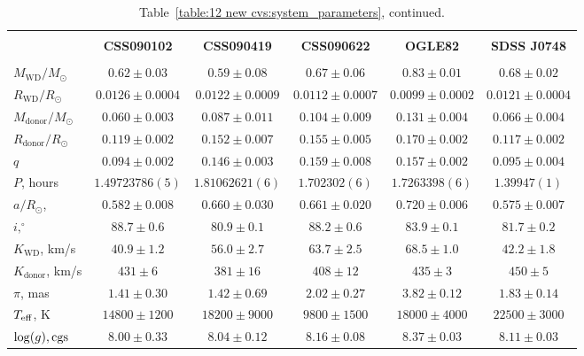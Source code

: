 \begin{landscape}
    \begin{table}
        \centering
        \caption{Table~\ref{table:12 new cvs:system_parameters}, continued.}
        \label{table:12 new cvs:system_parameters cont 1}
        \begin{tabular}{lccccc}
            \hline \\
            ~                          & \textbf{CSS090102}     & \textbf{CSS090419}    & \textbf{CSS090622}    & \textbf{OGLE82}   & \textbf{SDSS J0748} \\
            \hline \hline \\
            $M_\mathrm{WD}/M_\odot$    & $0.62\pm0.03$          & $0.59\pm0.08$         & $0.67\pm0.06$         & $0.83\pm0.01$     & $0.68\pm0.02$ \\
            $R_\mathrm{WD}/R_\odot$    & $0.0126\pm0.0004$      & $0.0122\pm0.0009$     & $0.0112\pm0.0007$     & $0.0099\pm0.0002$ & $0.0121\pm0.0004$ \\
            $M_\mathrm{donor}/M_\odot$ & $0.060\pm0.003$        & $0.087\pm0.011$       & $0.104\pm0.009$       & $0.131\pm0.004$   & $0.066\pm0.004$ \\
            $R_\mathrm{donor}/R_\odot$ & $0.119\pm0.002$        & $0.152\pm0.007$       & $0.155\pm0.005$       & $0.170\pm0.002$   & $0.117\pm0.002$ \\
            $q$                        & $0.094\pm0.002$        & $0.146\pm0.003$       & $0.159\pm0.008$       & $0.157\pm0.002$   & $0.095\pm0.004$ \\
            \hline
            $P$, hours                 & $1.49723786(5)$        & $1.81062621(6)$       & $1.702302(6)$         & $1.7263398(6)$    & $1.39947(1)$ \\
            $a/R_\odot$,               & $0.582\pm0.008$        & $0.660\pm0.030$       & $0.661\pm0.020$       & $0.720\pm0.006$   & $0.575\pm0.007$ \\
            $i, ^\circ$                & $88.7\pm0.6$           & $80.9\pm0.1$          & $88.2\pm0.6$          & $83.9\pm0.1$      & $81.7\pm0.2$ \\
            $K_\mathrm{WD}$, km/s      & $40.9\pm1.2$           & $56.0\pm2.7$          & $63.7\pm2.5$          & $68.5\pm1.0$      & $42.2\pm1.8$ \\
            $K_\mathrm{donor}$, km/s   & $431\pm6$              & $381\pm16$            & $408\pm12$            & $435\pm3$         & $450\pm5$ \\
            \hline
            $\pi$, mas                 & $1.41\pm0.30$          & $1.42\pm0.69$         & $2.02\pm0.27$         & $3.82\pm0.12$     & $1.83\pm0.14$ \\
            $T_{\rm eff}$, K           & $14800\pm1200$         & $18200\pm9000$        & $9800\pm1500$         & $18000\pm4000$    & $22500\pm3000$ \\
            $\log(g), {\rm cgs}$       & $8.00\pm0.33$          & $8.04\pm0.12$         & $8.16\pm0.08$         & $8.37\pm0.03$     & $8.11\pm0.03$ \\
            \hline
            \hline
        \end{tabular}
    \end{table}


\end{landscape}
